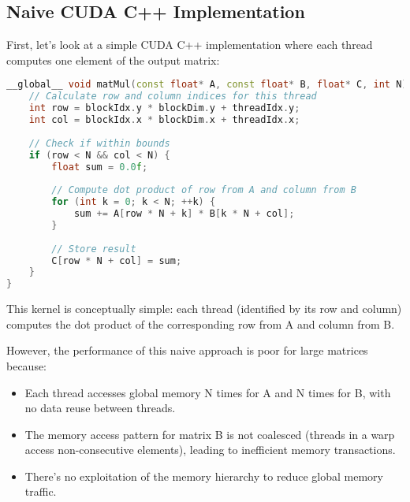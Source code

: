 \subsection{Naive CUDA C++ Implementation}

First, let's look at a simple CUDA C++ implementation where each thread computes one element of the output matrix:

\begin{lstlisting}[language=C++]
__global__ void matMul(const float* A, const float* B, float* C, int N) {
    // Calculate row and column indices for this thread
    int row = blockIdx.y * blockDim.y + threadIdx.y;
    int col = blockIdx.x * blockDim.x + threadIdx.x;
    
    // Check if within bounds
    if (row < N && col < N) {
        float sum = 0.0f;
        
        // Compute dot product of row from A and column from B
        for (int k = 0; k < N; ++k) {
            sum += A[row * N + k] * B[k * N + col];
        }
        
        // Store result
        C[row * N + col] = sum;
    }
}
\end{lstlisting}

This kernel is conceptually simple: each thread (identified by its row and column) computes the dot product of the corresponding row from A and column from B.

However, the performance of this naive approach is poor for large matrices because:

\begin{itemize}
    \item Each thread accesses global memory N times for A and N times for B, with no data reuse between threads.
    
    \item The memory access pattern for matrix B is not coalesced (threads in a warp access non-consecutive elements), leading to inefficient memory transactions.
    
    \item There's no exploitation of the memory hierarchy to reduce global memory traffic.
\end{itemize}


